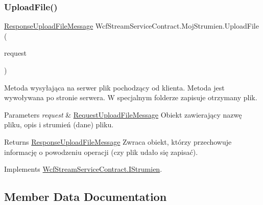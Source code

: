 \subsubsection{\texorpdfstring{Upload\+File()}{UploadFile()}}
{\footnotesize\ttfamily \hyperlink{class_wcf_stream_service_contract_1_1_response_upload_file_message}{Response\+Upload\+File\+Message} Wcf\+Stream\+Service\+Contract.\+Moj\+Strumien.\+Upload\+File (\begin{DoxyParamCaption}\item[{\hyperlink{class_wcf_stream_service_contract_1_1_request_upload_file_message}{Request\+Upload\+File\+Message}}]{request }\end{DoxyParamCaption})\hspace{0.3cm}{\ttfamily [inline]}}



Metoda wysyłająca na serwer plik pochodzący od klienta. Metoda jest wywoływana po stronie serwera. W specjalnym folderze zapisuje otrzymany plik. 


\begin{DoxyParams}{Parameters}
{\em request} & \hyperlink{class_wcf_stream_service_contract_1_1_request_upload_file_message}{Request\+Upload\+File\+Message} Obiekt zawierający nazwę pliku, opis i strumień (dane) pliku.\\
\hline
\end{DoxyParams}
\begin{DoxyReturn}{Returns}
\hyperlink{class_wcf_stream_service_contract_1_1_response_upload_file_message}{Response\+Upload\+File\+Message} Zwraca obiekt, którzy przechowuje informację o powodzeniu operacji (czy plik udało się zapisać).
\end{DoxyReturn}


Implements \hyperlink{interface_wcf_stream_service_contract_1_1_i_strumien_a1a1d9e27098173c02ad173ace1ef97e3}{Wcf\+Stream\+Service\+Contract.\+I\+Strumien}.



\subsection{Member Data Documentation}
\mbox{\label{class_wcf_stream_service_contract_1_1_moj_strumien_acdde11903400acb6062b4b733c86fa4f}} 
